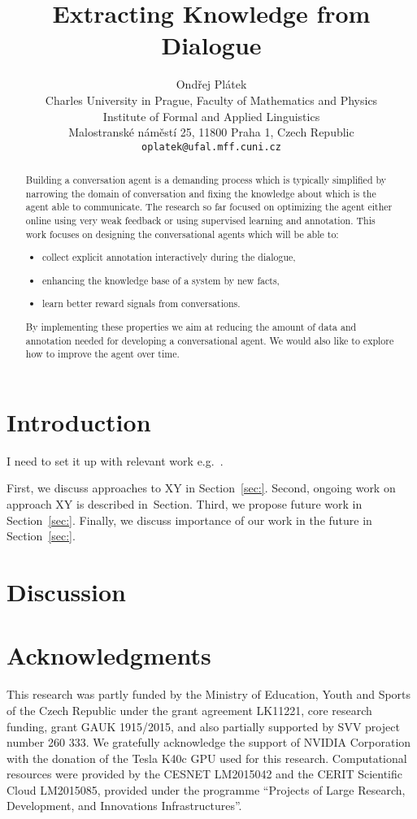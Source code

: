 \documentclass[11pt]{article}
\title{Extracting Knowledge from Dialogue}
\author{Ondřej Plátek \\
  Charles University in Prague, Faculty of Mathematics and Physics \\
  Institute of Formal and Applied Linguistics \\
  Malostranské náměstí 25, 11800 Praha 1, Czech Republic\\
  {\tt oplatek@ufal.mff.cuni.cz}\\}
\date{}
\begin{document}
\maketitle
\begin{abstract}
Building a conversation agent is a demanding process which is typically simplified by narrowing the domain of conversation and fixing the knowledge about which is the agent able to communicate.
The research so far focused on optimizing the agent either online using very weak feedback or using supervised learning and annotation.
This work focuses on designing the conversational agents which will be able to:
\begin{itemize}
    \item collect explicit annotation interactively during the dialogue,
    \item enhancing the knowledge base of a system by new facts,
    \item learn better reward signals from conversations.
\end{itemize}
By implementing these properties we aim at reducing the amount of data and annotation needed for developing a conversational agent.
We would also like to explore how to improve the agent over time.
\end{abstract}

\section{Introduction}
\label{sec:introduction}

I need to set it up with relevant work e.g.~\cite{young2010hidden}.

First, we discuss approaches to XY in Section~\ref{sec:}. 
Second, ongoing work on approach XY is described  in~Section. 
Third, we propose future work in Section~\ref{sec:}.
Finally, we discuss importance of our work in the future in Section~\ref{sec:}.




\section{Discussion}
\label{sec:discussion}

\section*{Acknowledgments}
This research was partly funded by the Ministry of Education, Youth and Sports of the Czech Republic under the grant agreement LK11221, core research funding, grant GAUK 1915/2015, and also partially supported by SVV project number 260 333. 
We gratefully acknowledge the support of NVIDIA Corporation with the donation of the Tesla K40c GPU used for this research.
Computational resources were provided by the CESNET LM2015042 and the CERIT Scientific Cloud LM2015085, provided under the programme ``Projects of Large Research, Development, and Innovations Infrastructures''.



\end{document}
